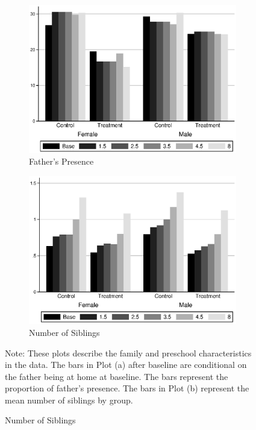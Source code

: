 \begin{figure}[H]
\begin{center}
\caption{Family Characteristics Over Time}
\label{fig:family-over-time}
	\begin{subfigure}[b]{0.49\textwidth}
		\centering
		\caption{Father's Presence}
		\label{fig:fhome}
			\includegraphics[width=\textwidth]{../output/family-fhome}
	\end{subfigure}
	\begin{subfigure}[b]{0.49\textwidth}
		\centering
		\caption{Number of Siblings}
		\label{fig:hhsibs}
			\includegraphics[width=\textwidth]{../output/family-hhsibs}
	\end{subfigure}
\end{center}
\raggedright
Note: These plots describe the family and preschool characteristics in the data. The bars in Plot (a) after baseline are conditional on the father being at home at baseline. The bars represent the proportion of father's presence. The bars in Plot (b) represent the mean number of siblings by group.
\end{figure}

